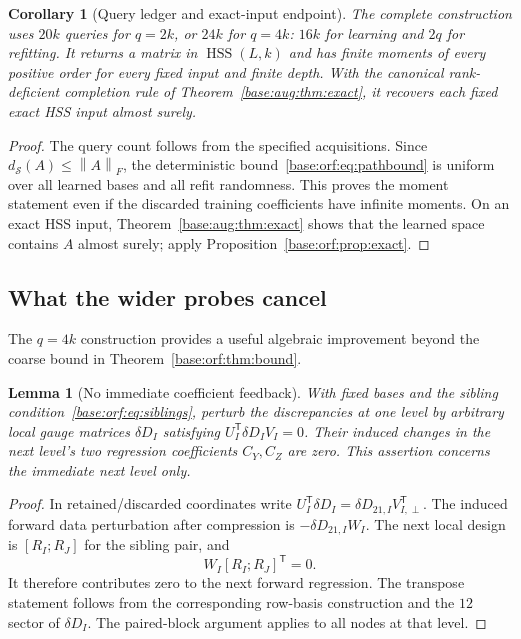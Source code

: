 \documentclass[11pt,oneside,openany,a4paper]{book}
\numberwithin{equation}{chapter}
\newtheorem{lemma}[theorem]{Lemma}
\newtheorem{corollary}[theorem]{Corollary}
\theoremstyle{definition}
\theoremstyle{remark}
\newcommand{\T}{\mathsf T}\newcommand{\Id}{I}
\newcommand{\F}[1]{\left\lVert#1\right\rVert_F}
\DeclareMathOperator{\HSS}{HSS}\DeclareMathOperator{\dist}{dist}
\begin{document}
\begin{corollary}[Query ledger and exact-input endpoint]\label{base:orf:cor:queries}
The complete construction uses $20k$ queries for $q=2k$, or $24k$ for
$q=4k$: $16k$ for learning and $2q$ for refitting. It returns a matrix in
$\HSS(L,k)$ and has finite moments of every positive order for every
fixed input and finite depth. With the canonical rank-deficient completion
rule of Theorem~\ref{base:aug:thm:exact}, it recovers each fixed exact HSS
input almost surely.
\end{corollary}
\begin{proof}
The query count follows from the specified acquisitions. Since
$d_{\mathcal S}(A)\le\F A$, the deterministic bound~\eqref{base:orf:eq:pathbound}
is uniform over all learned bases and all refit randomness. This proves
the moment statement even if the discarded training coefficients have
infinite moments. On an exact HSS input, Theorem~\ref{base:aug:thm:exact}
shows that the learned space contains $A$ almost surely; apply
Proposition~\ref{base:orf:prop:exact}.
\end{proof}

\subsection{What the wider probes cancel}
The $q=4k$ construction provides a useful algebraic improvement beyond
the coarse bound in Theorem~\ref{base:orf:thm:bound}.

\begin{lemma}[No immediate coefficient feedback]\label{base:orf:lem:feedback}
With fixed bases and the sibling condition~\eqref{base:orf:eq:siblings}, perturb
the discrepancies at one level by arbitrary local gauge matrices
$\delta D_I$ satisfying $U_I^{\T}\delta D_IV_I=0$. Their induced changes
in the next level's two regression coefficients $C_Y,C_Z$ are zero.
This assertion concerns the immediate next level only.
\end{lemma}
\begin{proof}
In retained/discarded coordinates write
$U_I^{\T}\delta D_I=\delta D_{21,I}V_{I,\perp}^{\T}$.
The induced forward data perturbation after compression is
$-\delta D_{21,I}W_I$. The next local design is $[R_I;R_J]$ for the
sibling pair, and
\[
 W_I[R_I;R_J]^{\T}=0.
\]
It therefore contributes zero to the next forward regression. The
transpose statement follows from the corresponding row-basis construction
and the $12$ sector of $\delta D_I$. The paired-block argument applies
to all nodes at that level.
\end{proof}
\end{document}
